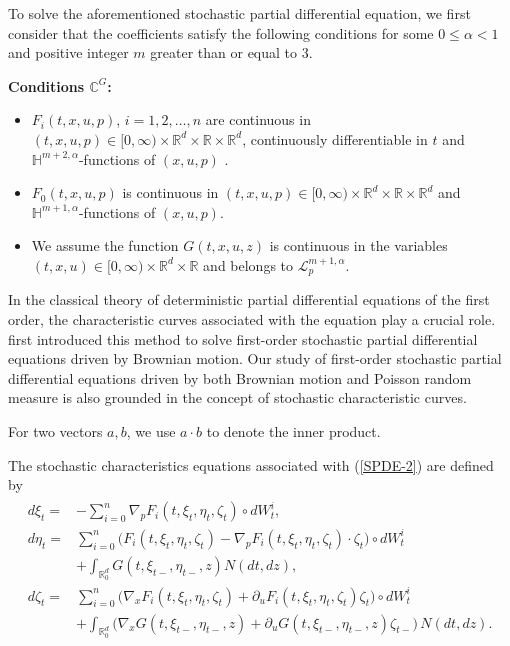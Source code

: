 \documentclass[12pt,oneside, reqno]{amsart}
\newcommand{\be}{\begin{eqnarray}}
\newcommand{\ee}{\end{eqnarray}}
\def\mC{{\mathbb C}}
\def\mH{{\mathbb H}}
\def\mR{{\mathbb R}}
\def\sL{{\mathscr L}}
\def\leq{\leqslant}
\numberwithin{equation}{section}
\begin{document}
To solve the aforementioned stochastic partial differential equation, we first consider that the coefficients satisfy the following conditions for some $0\leq\alpha<1$ and positive integer $m$ greater than or equal to 3. 





\textbf{Conditions $\mC^G$:}
\begin{itemize}	
	\item [($\mC_1^G$)] $F_i(t,x,u,p)$, $i=1,2,\ldots, n$ are continuous in $(t,x,u,p)\in[0,\infty)\times \mR^{d}\times \mR\times \mR^d$, continuously differentiable in $t$ and $\mH^{m+2,\alpha}$-functions of $(x,u,p)$ . 
	
	\item [($\mC_2^G$)] $F_0(t,x,u,p)$ is continuous in $(t,x,u,p)\in[0,\infty)\times \mR^{d}\times \mR\times \mR^d$ and $\mH^{m+1,\alpha}$-functions of $(x,u,p)$. 
	
	\item [($\mC_3^G$)]   We assume the function $G(t,x,u,z)$ is continuous in the variables $(t,x,u)\in[0,\infty)\times \mR^{d}\times \mR$  and belongs to $\sL_{p}^{m+1,\alpha}$.
\end{itemize}


In the classical theory of deterministic partial differential equations of the first order, the characteristic curves associated with the equation play a crucial role. \cite{Kunita1984} first introduced this method to solve first-order stochastic partial differential equations driven by Brownian motion. Our study of first-order stochastic partial differential equations driven by both Brownian motion and Poisson random measure is also grounded in the concept of stochastic characteristic curves.


 For two vectors $a,b$, we use $a\cdot b$ to denote the inner product.

 The stochastic characteristics equations associated  with (\ref{SPDE-2}) are defined by 
	\be\label{XEZexpross1}
	\begin{split}
	d\xi_t=&-\sum_{i=0}^{n}\nabla_p F_i(t,\xi_t,\eta_t,\zeta_t)\circ dW_t^i,\\
	d\eta_t=&\sum_{i=0}^{n} \bigg(F_i(t,\xi_t,\eta_t,\zeta_t)- \nabla_pF_i(t,\xi_t,\eta_t,\zeta_t)\cdot\zeta_t \bigg)\circ dW_t^i\\
	&+\int_{\mR^d_0}G(t,\xi_{t-},\eta_{t-},z)N(dt,dz),\\
	d\zeta_t=&\sum_{i=0}^{n} \bigg(\nabla_xF_i(t,\xi_t,\eta_t,\zeta_t)+ \partial_uF_i(t,\xi_t,\eta_t,\zeta_t)\zeta_t \bigg)\circ dW_t^i\\
	&+\int_{\mR^d_0}\bigg(\nabla_xG(t,\xi_{t-},\eta_{t-},z)+\partial_uG(t,\xi_{t-},\eta_{t-},z)\zeta_{t-}\bigg)\,N(dt,dz).
	\end{split}
	\ee
	
\end{document}
